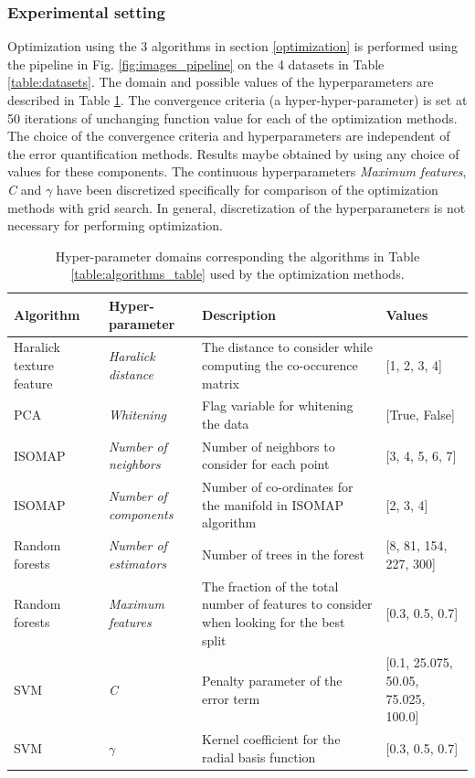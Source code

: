 \subsubsection{Experimental setting}
Optimization using the 3 algorithms in section \ref{optimization} is performed using the pipeline in Fig. \ref{fig:images_pipeline} on the 4 datasets in Table \ref{table:datasets}. The domain and possible values of the hyperparameters are described in Table \ref{table:hyper}. 
The convergence criteria (a hyper-hyper-parameter) is set at 50 iterations of unchanging  function value for each of the optimization methods. The choice of the convergence criteria and hyperparameters are independent of the error quantification methods. Results maybe obtained by using any choice of values for these components. The continuous hyperparameters \textit{Maximum features}, \textit{C} and $\gamma$ have been discretized specifically for comparison of the optimization methods with grid search. In general, discretization of the hyperparameters is not necessary for performing optimization.
\begin{table}[ht!]
\centering
\caption{Hyper-parameter domains corresponding the algorithms in Table \ref{table:algorithms_table} used by the optimization methods.}
\begin{tabularx}{\linewidth}{ |X|X|X|X| } 
 \hline
 Algorithm & Hyper-parameter & Description & Values \\ 
 \hline
 Haralick texture feature & \textit{Haralick distance} & The distance to consider while computing the co-occurence matrix & [1, 2, 3, 4]\\
 \hline
 PCA & \textit{Whitening} & Flag variable for whitening the data & [True, False]\\
 \hline
  ISOMAP & \textit{Number of neighbors} & Number of neighbors to consider for each point & [3, 4, 5, 6, 7] \\
 \hline
 ISOMAP & \textit{Number of components} & Number of co-ordinates for the manifold in ISOMAP algorithm & [2, 3, 4]\\
 \hline
 Random forests & \textit{Number of estimators} & Number of trees in the forest & [8,  81, 154, 227, 300]\\
 \hline
 Random forests & \textit{Maximum features} & The fraction of the total number of features to consider when looking for the best split & [0.3, 0.5, 0.7]\\
 \hline
 SVM & \textit{C} & Penalty parameter of the error term & [0.1, 25.075, 50.05, 75.025, 100.0] \\
 \hline
 SVM & $\gamma$ & Kernel coefficient for the radial basis function & [0.3, 0.5, 0.7] \\
 \hline
 \end{tabularx}
 
\label{table:hyper}
\end{table}
